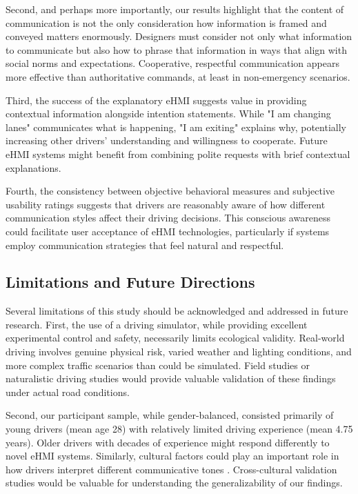 \documentclass[manuscript,review]{acmart}
\begin{document}
Second, and perhaps more importantly, our results highlight that the content of communication is not the only consideration how information is framed and conveyed matters enormously. Designers must consider not only what information to communicate but also how to phrase that information in ways that align with social norms and expectations. Cooperative, respectful communication appears more effective than authoritative commands, at least in non-emergency scenarios.

Third, the success of the explanatory eHMI suggests value in providing contextual information alongside intention statements. While "I am changing lanes" communicates what is happening, "I am exiting" explains why, potentially increasing other drivers' understanding and willingness to cooperate. Future eHMI systems might benefit from combining polite requests with brief contextual explanations.

Fourth, the consistency between objective behavioral measures and subjective usability ratings suggests that drivers are reasonably aware of how different communication styles affect their driving decisions. This conscious awareness could facilitate user acceptance of eHMI technologies, particularly if systems employ communication strategies that feel natural and respectful.

\subsection{Limitations and Future Directions}

Several limitations of this study should be acknowledged and addressed in future research. First, the use of a driving simulator, while providing excellent experimental control and safety, necessarily limits ecological validity. Real-world driving involves genuine physical risk, varied weather and lighting conditions, and more complex traffic scenarios than could be simulated. Field studies or naturalistic driving studies would provide valuable validation of these findings under actual road conditions.

Second, our participant sample, while gender-balanced, consisted primarily of young drivers (mean age 28) with relatively limited driving experience (mean 4.75 years). Older drivers with decades of experience might respond differently to novel eHMI systems. Similarly, cultural factors could play an important role in how drivers interpret different communicative tones \cite{ehrhardt2024comparing, lundgren2017new}. Cross-cultural validation studies would be valuable for understanding the generalizability of our findings.
\end{document}
